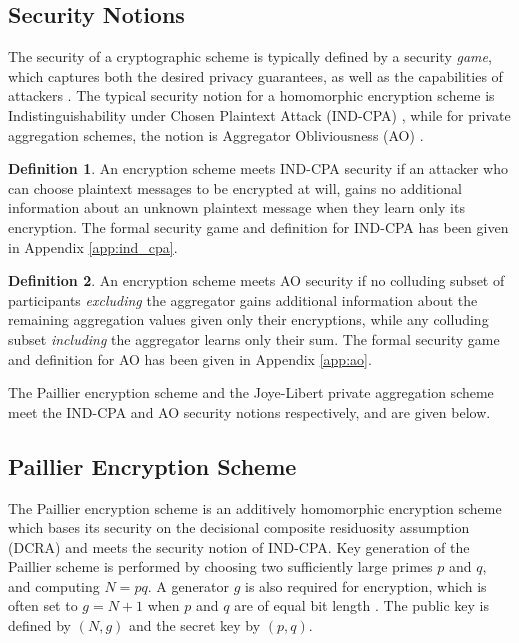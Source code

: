\documentclass[10pt,letterpaper,oneside,twocolumn,journal]{IEEEtran}
\theoremstyle{definition}
\newtheorem{definition}{Definition}[section]
\theoremstyle{definition}
\theoremstyle{remark}
\begin{document}
\subsection{Security Notions}
The security of a cryptographic scheme is typically defined by a security \textit{game}, which captures both the desired privacy guarantees, as well as the capabilities of attackers \cite{katzIntroductionModernCryptography2008}. The typical security notion for a homomorphic encryption scheme is Indistinguishability under Chosen Plaintext Attack (IND-CPA) \cite{chaseSecurityHomomorphicEncryption2017}, while for private aggregation schemes, the notion is Aggregator Obliviousness (AO) \cite{shiPrivacyPreservingAggregationTimeSeries2011}. 
\begin{definition}
An encryption scheme meets IND-CPA security if an attacker who can choose plaintext messages to be encrypted at will, gains no additional information about an unknown plaintext message when they learn only its encryption. The formal security game and definition for IND-CPA has been given in Appendix \ref{app:ind_cpa}.
\end{definition}
\begin{definition}
An encryption scheme meets AO security if no colluding subset of participants \textit{excluding} the aggregator gains additional information about the remaining aggregation values given only their encryptions, while any colluding subset \textit{including} the aggregator learns only their sum. The formal security game and definition for AO has been given in Appendix \ref{app:ao}.
\end{definition}

The Paillier encryption scheme and the Joye-Libert private aggregation scheme meet the IND-CPA and AO security notions respectively, and are given below.

% 
% 

\subsection{Paillier Encryption Scheme} \label{subsec:paillier_scheme}
The Paillier encryption scheme \cite{paillierPublicKeyCryptosystemsBased1999} is an additively homomorphic encryption scheme which bases its security on the decisional composite residuosity assumption (DCRA) and meets the security notion of IND-CPA. Key generation of the Paillier scheme is performed by choosing two sufficiently large primes $p$ and $q$, and computing $N=pq$. A generator $g$ is also required for encryption, which is often set to $g=N+1$ when $p$ and $q$ are of equal bit length \cite{katzIntroductionModernCryptography2008}. The public key is defined by $(N, g)$ and the secret key by $(p, q)$.
\end{document}
